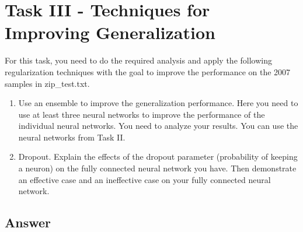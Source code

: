 \documentclass[
	12pt, %
]{../Template/fphw}
\begin{document}

\section*{Task III - Techniques for Improving Generalization}
\begin{problem}
For this task, you need to do the required analysis and apply the following regularization techniques with the
goal to improve the performance on the 2007 samples in zip\_test.txt.
\begin{enumerate}[label = (\arabic*)]
\item Use an ensemble to improve the generalization performance. Here you need to use at least three neural
networks to improve the performance of the individual neural networks. You need to analyze your
results. You can use the neural networks from Task II.
\item Dropout. Explain the effects of the dropout parameter (probability of keeping a neuron) on the fully
connected neural network you have. Then demonstrate an effective case and an ineffective case on
your fully connected neural network.
\end{enumerate}
\end{problem}


\subsection*{Answer} 
\end{document}
